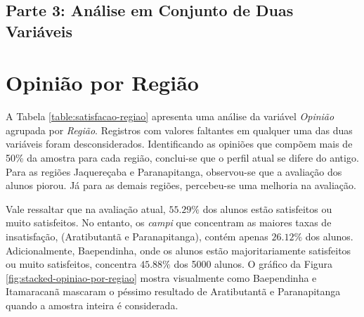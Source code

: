 \documentclass[10pt,a4paper,oneside]{article}
\newcommand{\arat}{Aratibutantã\xspace}
\newcommand{\baep}{Baependinha\xspace}
\newcommand{\itam}{Itamaracanã\xspace}
\newcommand{\jaqu}{Jaquereçaba\xspace}
\newcommand{\para}{Paranapitanga\xspace}
\begin{document}
\FloatBarrier
\clearpage
\begin{center}
\section*{Parte 3: Análise em Conjunto de Duas Variáveis}
\end{center}

\section{Opinião por Região}
\label{section:opiniao-regiao}

A Tabela \ref{table:satisfacao-regiao} apresenta uma análise da variável \textit{Opinião} agrupada por \textit{Região}. Registros com valores faltantes em qualquer uma das duas variáveis foram desconsiderados. Identificando as opiniões que compõem mais de 50\% da amostra para cada região, conclui-se que o perfil atual se difere do antigo. Para as regiões \jaqu e \para, observou-se que a avaliação dos alunos piorou. Já para as demais regiões, percebeu-se uma melhoria na avaliação. 

Vale ressaltar que na avaliação atual, $55.29\%$ dos alunos estão satisfeitos ou muito satisfeitos. No entanto, os \textit{campi} que concentram as maiores taxas de insatisfação, (\arat e \para), contém apenas $26.12\%$ dos alunos. Adicionalmente, \baep, onde os alunos estão majoritariamente satisfeitos ou muito satisfeitos, concentra $45.88\%$ dos 5000 alunos. O gráfico da Figura \ref{fig:stacked-opiniao-por-regiao} mostra visualmente como \baep e \itam mascaram o péssimo resultado de \arat e \para quando a amostra inteira é considerada.
\end{document}

